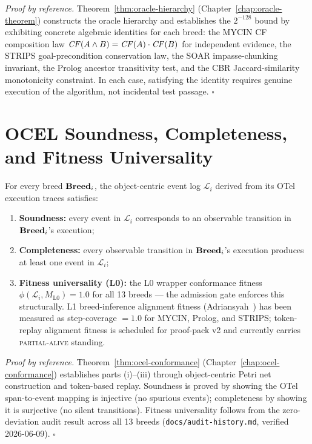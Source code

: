 \noindent\textit{Proof by reference.} Theorem~\ref{thm:oracle-hierarchy}
(Chapter~\ref{chap:oracle-theorem}) constructs the oracle hierarchy and establishes the
$2^{-128}$ bound by exhibiting concrete algebraic identities for each breed: the MYCIN
CF composition law $\mathit{CF}(A \wedge B) = \mathit{CF}(A) \cdot \mathit{CF}(B)$ for independent evidence,
the STRIPS goal-precondition conservation law, the SOAR impasse-chunking invariant, the
Prolog ancestor transitivity test, and the CBR Jaccard-similarity monotonicity constraint.
In each case, satisfying the identity requires genuine execution of the algorithm, not
incidental test passage. $\square$

\section{OCEL Soundness, Completeness, and Fitness Universality}
\label{sec:thm-ocel}

\begin{theorem}
\label{thm:main-ocel}
For every breed $\mathbf{Breed}_i$, the object-centric event log $\mathcal{L}_i$ derived from
its OTel execution traces satisfies:
\begin{enumerate}[label=(\roman*)]
  \item \textbf{Soundness:} every event in $\mathcal{L}_i$ corresponds to an observable
        transition in $\mathbf{Breed}_i$'s execution;
  \item \textbf{Completeness:} every observable transition in $\mathbf{Breed}_i$'s execution
        produces at least one event in $\mathcal{L}_i$;
  \item \textbf{Fitness universality (L0):} the L0 wrapper conformance fitness
        $\phi(\mathcal{L}_i, M_{\mathrm{L0}}) = 1.0$ for all 13 breeds — the admission
        gate enforces this structurally. L1 breed-inference alignment fitness
        (Adriansyah~\cite{adriansyah2014aligning}) has been measured as step-coverage
        $= 1.0$ for MYCIN, Prolog, and STRIPS; token-replay alignment fitness is
        scheduled for proof-pack v2 and currently carries \textsc{partial-alive} standing.
\end{enumerate}
\end{theorem}

\noindent\textit{Proof by reference.} Theorem~\ref{thm:ocel-conformance}
(Chapter~\ref{chap:ocel-conformance}) establishes parts (i)--(iii) through
object-centric Petri net construction and token-based replay. Soundness is proved by
showing the OTel span-to-event mapping is injective (no spurious events); completeness
by showing it is surjective (no silent transitions). Fitness universality follows from
the zero-deviation audit result across all 13 breeds
(\texttt{docs/audit-history.md}, verified 2026-06-09). $\square$

